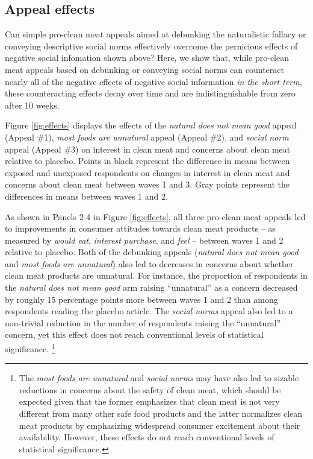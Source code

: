 \documentclass[12pt]{article}
\begin{document}
\subsection{Appeal effects}

Can simple pro-clean meat appeals aimed at debunking the naturalistic fallacy or conveying descriptive social norms effectively overcome the pernicious effects of negative social infomation shown above? Here, we show that, while pro-clean meat appeals based on debunking or conveying social norms can counteract nearly all of the negative effects of negative social information \textit{in the short term}, these counteracting effects decay over time and are indistinguishable from zero after 10 weeks.

Figure \ref{fig:effects} displays the effects of the \textit{natural does not mean good} appeal (Appeal \#1), \textit{most foods are unnatural} appeal (Appeal \#2), and \textit{social norm} appeal (Appeal \#3) on interest in clean meat and concerns about clean meat relative to placebo. Points in black represent the difference in means between exposed and unexposed respondents on changes in interest in clean meat and concerns about clean meat between waves 1 and 3. Gray points represent the differences in means between waves 1 and 2. 


As shown in Panels 2-4 in Figure \ref{fig:effects}, all three pro-clean meat appeals led to improvements in consumer attitudes towards clean meat products -- as measured by \textit{would eat}, \textit{interest purchase}, and \textit{feel} -- between waves 1 and 2 relative to placebo. Both of the debunking appeals (\textit{natural does not mean good} and \textit{most foods are unnatural}) also led to decreases in concerns about whether clean meat products are unnatural. For instance, the proportion of respondents in the \textit{natural does not mean good} arm raising ``unnatural'' as a concern decreased by roughly 15 percentage points more between waves 1 and 2 than among respondents reading the placebo article. The \textit{social norms} appeal also led to a non-trivial reduction in the number of respondents raising the ``unnatural'' concern, yet this effect does not reach conventional levels of statistical significance.
\footnote{The \textit{most foods are unnatural} and \textit{social norms} may have also led to sizable reductions in concerns about the safety of clean meat, which should be expected given that the former emphasizes that clean meat is not very different from many other safe food products and the latter normalizes clean meat products by emphasizing widespread consumer excitement about their availability. However, these effects do not reach conventional levels of statistical significance.}
\end{document}
